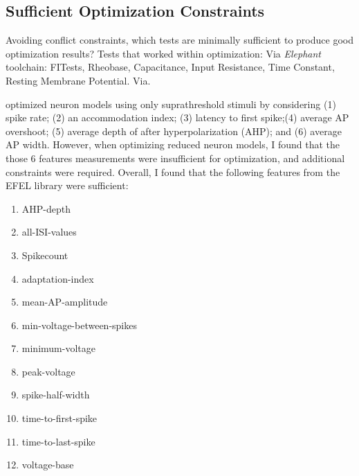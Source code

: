 \subsection{Sufficient Optimization Constraints}
Avoiding conflict constraints, which tests are minimally sufficient to produce good optimization results?
Tests that worked within optimization:
Via \emph{Elephant} toolchain: FITests, Rheobase, Capacitance, Input Resistance, Time Constant, Resting Membrane Potential.
Via. 

\cite{druckmann2007novel} optimized neuron models using only suprathreshold stimuli by considering (1) spike rate; (2) an accommodation index; (3) latency to first spike;(4) average AP overshoot; (5) average depth of after hyperpolarization (AHP); and (6) average AP width.
However, when optimizing reduced neuron models, I found that the those 6 features measurements were insufficient for optimization, and additional constraints were required.
Overall, I found that the following features from the EFEL library were sufficient:
\begin{enumerate}
\item AHP-depth
\item all-ISI-values
\item Spikecount %
\item adaptation-index
\item mean-AP-amplitude
\item min-voltage-between-spikes
\item minimum-voltage
\item peak-voltage
\item spike-half-width
\item time-to-first-spike
\item time-to-last-spike
\item voltage-base
\end{enumerate}


